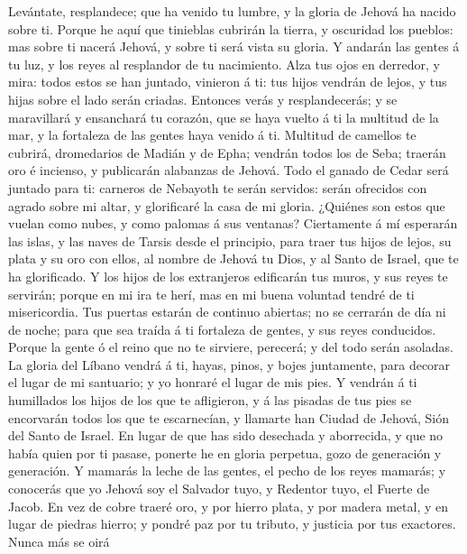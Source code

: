  Levántate, resplandece; que ha venido tu lumbre, y la
gloria de Jehová ha nacido sobre ti.  Porque he aquí que
tinieblas cubrirán la tierra, y oscuridad los pueblos: mas sobre ti
nacerá Jehová, y sobre ti será vista su gloria.  Y andarán
las gentes á tu luz, y los reyes al resplandor de tu nacimiento.
 Alza tus ojos en derredor, y mira: todos estos se han
juntado, vinieron á ti: tus hijos vendrán de lejos, y tus hijas sobre el
lado serán criadas.  Entonces verás y resplandecerás; y se
maravillará y ensanchará tu corazón, que se haya vuelto á ti la multitud
de la mar, y la fortaleza de las gentes haya venido á ti. 
Multitud de camellos te cubrirá, dromedarios de Madián y de Epha;
vendrán todos los de Seba; traerán oro é incienso, y publicarán
alabanzas de Jehová.  Todo el ganado de Cedar será juntado
para ti: carneros de Nebayoth te serán servidos: serán ofrecidos con
agrado sobre mi altar, y glorificaré la casa de mi gloria. 
¿Quiénes son estos que vuelan como nubes, y como palomas á sus ventanas?
 Ciertamente á mí esperarán las islas, y las naves de Tarsis
desde el principio, para traer tus hijos de lejos, su plata y su oro con
ellos, al nombre de Jehová tu Dios, y al Santo de Israel, que te ha
glorificado.  Y los hijos de los extranjeros edificarán tus
muros, y sus reyes te servirán; porque en mi ira te herí, mas en mi
buena voluntad tendré de ti misericordia.  Tus puertas
estarán de continuo abiertas; no se cerrarán de día ni de noche; para
que sea traída á ti fortaleza de gentes, y sus reyes conducidos.
 Porque la gente ó el reino que no te sirviere, perecerá; y
del todo serán asoladas.  La gloria del Líbano vendrá á ti,
hayas, pinos, y bojes juntamente, para decorar el lugar de mi santuario;
y yo honraré el lugar de mis pies.  Y vendrán á ti
humillados los hijos de los que te afligieron, y á las pisadas de tus
pies se encorvarán todos los que te escarnecían, y llamarte han Ciudad
de Jehová, Sión del Santo de Israel.  En lugar de que has
sido desechada y aborrecida, y que no había quien por ti pasase, ponerte
he en gloria perpetua, gozo de generación y generación.  Y
mamarás la leche de las gentes, el pecho de los reyes mamarás; y
conocerás que yo Jehová soy el Salvador tuyo, y Redentor tuyo, el Fuerte
de Jacob.  En vez de cobre traeré oro, y por hierro plata,
y por madera metal, y en lugar de piedras hierro; y pondré paz por tu
tributo, y justicia por tus exactores.  Nunca más se oirá
